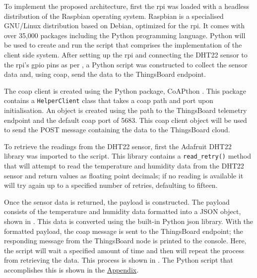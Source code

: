 To implement the proposed architecture, first the \gls{rpi} was loaded with a 
headless distribution of the Raspbian \citep{raspbian_raspbian_2018} operating system. 
Raspbian is a specialised GNU/Linux distribution based on Debian, optimized for 
the \gls{rpi}. 
It comes with over 35,000 packages including the Python programming language. 
Python will be used to create and run the script that comprises the implementation
of the client side system.
After setting up the \gls{rpi} and connecting the DHT22 sensor to the \gls{rpi}'s
\gls{gpio} pins as per , a Python script was constructed
to collect the sensor data and, using \gls{coap}, send the data to the ThingsBoard
\citep{thingsboard_inc._thingsboard_2018} endpoint. 

The \gls{coap} client is created using the Python package, CoAPthon
\citep{tanganelli_coapthon3_2018}. 
This package contains a \texttt{HelperClient} class that takes a \gls{coap} 
path and port upon initialisation. 
An object is created using the path to the 
ThingsBoard telemetry endpoint and the default \gls{coap} port of 5683.
This \gls{coap} client object will be used to send the POST message containing
the data to the ThingsBoard cloud.

To retrieve the readings from the DHT22 sensor,
first the Adafruit DHT22 library \citep{adafruit_adafruit_python_dht_2018} 
was imported to the script. This library contains a \texttt{read\_retry()} 
method that will attempt to read the temperature and humidity data from the 
DHT22 sensor and return values as floating point decimals; 
if no reading is available it will try again up to a specified number of retries,
defaulting to fifteen.


Once the sensor data is returned, the payload is constructed. The payload 
consists of the temperature and humidity data formatted into a JSON object, 
shown in . This data is converted using the built-in
Python \gls{json} library. 
With the formatted payload, the \gls{coap} message is sent to the ThingsBoard
endpoint; the responding message from the ThingsBoard node is printed to the console.
Here, the script will wait a specified amount of time and then will repeat the 
process from retrieving the data. This process is shown in 
. The Python script that accomplishes this is 
shown in the \hyperref[app:A]{Appendix}.

